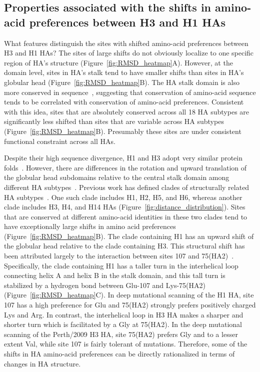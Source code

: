 \documentclass[9pt,twocolumn,twoside]{pnas-new}
\begin{document}
\subsection*{Properties associated with the shifts in amino-acid preferences between H3 and H1 HAs}
What features distinguish the sites with shifted amino-acid preferences between H3 and H1 HAs?
The sites of large shifts do not obviously localize to one specific region of HA's structure (Figure~\ref{fig:RMSD_heatmap}A).
However, at the domain level, sites in HA's stalk tend to have smaller shifts than sites in HA's globular head (Figure~\ref{fig:RMSD_heatmap}B). 
The HA stalk domain is also more conserved in sequence~\cite{nobusawa1991comparison,hai2012influenza,mallajosyula2014influenza}, suggesting that conservation of amino-acid sequence tends to be correlated with conservation of amino-acid preferences.
Consistent with this idea, sites that are absolutely conserved across all 18 HA subtypes are significantly less shifted than sites that are variable across HA subtypes (Figure~\ref{fig:RMSD_heatmap}B).
Presumably these sites are under consistent functional constraint across all HAs.

Despite their high sequence divergence, H1 and H3 adopt very similar protein folds~\cite{ha2002h5,russell2004h1}.
However, there are differences in the rotation and upward translation of the globular head subdomains relative to the central stalk domain among different HA subtypes~\cite{ha2002h5,russell2004h1}.
Previous work has defined clades of structurally related HA subtypes~\cite{ha2002h5,russell2004h1}. 
One such clade includes H1, H2, H5, and H6, whereas another clade includes H3, H4, and H14 HAs (Figure~\ref{fig:distance_distribution}).
Sites that are conserved at different amino-acid identities in these two clades tend to have exceptionally large shifts in amino acid preferences (Figure~\ref{fig:RMSD_heatmap}B).
The clade containing H1 has an upward shift of the globular head relative to the clade containing H3.
This structural shift has been attributed largely to the interaction between sites 107 and 75(HA2)~\cite{ha2002h5,russell2004h1}.
Specifically, the clade containing H1 has a taller turn in the interhelical loop connecting helix A and helix B in the stalk domain, and this tall turn is stabilized by a hydrogen bond between Glu-107 and Lys-75(HA2) (Figure~\ref{fig:RMSD_heatmap}C).
In deep mutational scanning of the H1 HA, site 107 has a high preference for Glu and 75(HA2) strongly prefers positively charged Lys and Arg.
In contrast, the interhelical loop in H3 HA makes a sharper and shorter turn which is facilitated by a Gly at 75(HA2).
In the deep mutational scanning of the Perth/2009 H3 HA, site 75(HA2) prefers Gly and to a lesser extent Val, while site 107 is fairly tolerant of mutations.
Therefore, some of the shifts in HA amino-acid preferences can be directly rationalized in terms of changes in HA structure.
\end{document}
